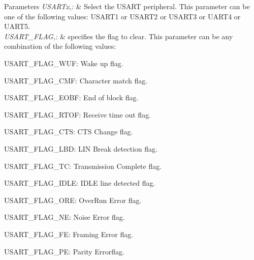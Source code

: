 \begin{DoxyParams}{Parameters}
{\em U\-S\-A\-R\-Tx,\-:} & Select the U\-S\-A\-R\-T peripheral. This parameter can be one of the following values\-: U\-S\-A\-R\-T1 or U\-S\-A\-R\-T2 or U\-S\-A\-R\-T3 or U\-A\-R\-T4 or U\-A\-R\-T5. \\
\hline
{\em U\-S\-A\-R\-T\-\_\-\-F\-L\-A\-G,\-:} & specifies the flag to clear. This parameter can be any combination of the following values\-: \begin{DoxyItemize}
\item U\-S\-A\-R\-T\-\_\-\-F\-L\-A\-G\-\_\-\-W\-U\-F\-: Wake up flag. \item U\-S\-A\-R\-T\-\_\-\-F\-L\-A\-G\-\_\-\-C\-M\-F\-: Character match flag. \item U\-S\-A\-R\-T\-\_\-\-F\-L\-A\-G\-\_\-\-E\-O\-B\-F\-: End of block flag. \item U\-S\-A\-R\-T\-\_\-\-F\-L\-A\-G\-\_\-\-R\-T\-O\-F\-: Receive time out flag. \item U\-S\-A\-R\-T\-\_\-\-F\-L\-A\-G\-\_\-\-C\-T\-S\-: C\-T\-S Change flag. \item U\-S\-A\-R\-T\-\_\-\-F\-L\-A\-G\-\_\-\-L\-B\-D\-: L\-I\-N Break detection flag. \item U\-S\-A\-R\-T\-\_\-\-F\-L\-A\-G\-\_\-\-T\-C\-: Transmission Complete flag. \item U\-S\-A\-R\-T\-\_\-\-F\-L\-A\-G\-\_\-\-I\-D\-L\-E\-: I\-D\-L\-E line detected flag. \item U\-S\-A\-R\-T\-\_\-\-F\-L\-A\-G\-\_\-\-O\-R\-E\-: Over\-Run Error flag. \item U\-S\-A\-R\-T\-\_\-\-F\-L\-A\-G\-\_\-\-N\-E\-: Noise Error flag. \item U\-S\-A\-R\-T\-\_\-\-F\-L\-A\-G\-\_\-\-F\-E\-: Framing Error flag. \item U\-S\-A\-R\-T\-\_\-\-F\-L\-A\-G\-\_\-\-P\-E\-: Parity Errorflag.\end{DoxyItemize}
\\
\hline
\end{DoxyParams}
